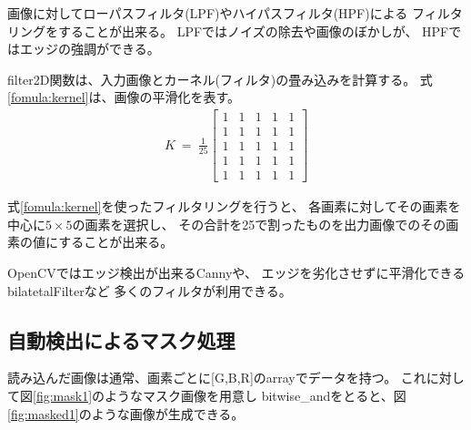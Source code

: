 \documentclass[dvipdfmx]{jsarticle}
\begin{document}
画像に対してローパスフィルタ(LPF)やハイパスフィルタ(HPF)による
フィルタリングをすることが出来る。
LPFではノイズの除去や画像のぼかしが、
HPFではエッジの強調ができる。

filter2D関数は、入力画像とカーネル(フィルタ)の畳み込みを計算する。
式\ref{fomula:kernel}は、画像の平滑化を表す。
\begin{eqnarray}
  K ~=~ \frac{1}{25}
  \left[
    \begin{array}{rrrrr}
      1&1&1&1&1\\
      1&1&1&1&1\\
      1&1&1&1&1\\
      1&1&1&1&1\\
      1&1&1&1&1
    \end{array}
  \right]
  \label{fomula:kernel}
\end{eqnarray}

式\ref{fomula:kernel}を使ったフィルタリングを行うと、
各画素に対してその画素を中心に$5\times5$の画素を選択し、
その合計を25で割ったものを出力画像でのその画素の値にすることが出来る。

OpenCVではエッジ検出が出来るCannyや、
エッジを劣化させずに平滑化できるbilatetalFilterなど
多くのフィルタが利用できる。


\subsection{自動検出によるマスク処理}

読み込んだ画像は通常、画素ごとに[G,B,R]のarrayでデータを持つ。
これに対して図\ref{fig:mask1}のようなマスク画像を用意し
bitwise\_andをとると、図\ref{fig:masked1}のような画像が生成できる。
\end{document}
